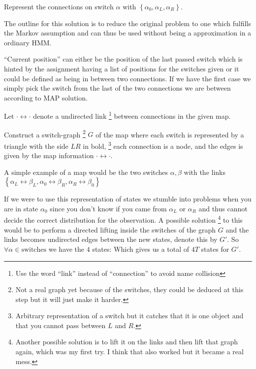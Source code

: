 \documentclass[a4paper,twoside=false,abstract=false,numbers=noenddot,
titlepage=false,headings=small,parskip=half,version=last]{scrartcl}
\begin{document}
\begin{solution}
    Represent the connections on switch $\alpha$ with 
    $\left\{\alpha_0,\alpha_L,\alpha_R\right\}$. 

    The outline for this solution is to reduce the original problem to one
    which fulfills the Markov assumption and can thus be used without being a
    approximation in a ordinary HMM.

    ``Current position'' can either be the position of the last passed switch
    which is hinted by the assignment having a list of positions for the
    switches given or it could be defined as being in between two connections.
    If we have the first case we simply pick the switch from the last of the
    two connections we are between according to MAP solution. 

    Let $\cdot\leftrightarrow\cdot$ denote a undirected link
    \footnote{Use the word ``link'' instead of ``connection'' to avoid 
    name collision}
    between connections in the given map.

    Construct a switch-graph
    \footnote{Not a real graph yet because of the
    switches, they could be deduced at this step but it will just make it
    harder.}
    $G$ of the map where each switch is represented by a triangle with the
    side $LR$ in bold,
    \footnote{Arbitrary representation of a switch but it catches that it is
    one object and that you cannot pass between $L$ and $R$.} 
    each connection is a node, and the edges is given by the map information
    $\cdot\leftrightarrow\cdot$. 

    A simple example of a map would be the two switches $\alpha,\beta$ with the
    links 
    $\left\{
        \alpha_L\leftrightarrow\beta_L,
        \alpha_0\leftrightarrow\beta_R,
        \alpha_R\leftrightarrow\beta_0
    \right\}$

    If we were to use this representation of states we stumble into
    problems when you are in state $\alpha_0$ since you don't know if you came
    from $\alpha_L$ or $\alpha_R$ and thus cannot decide the correct 
    distribution for the observation. A possible solution
    \footnote{Another possible solution is to lift it on the links and then
    lift that graph again, which was my first try. I think that also worked but
    it became a real mess.}
    to this would be to
    perform a directed lifting inside the switches of the graph $G$ and the
    links becomes undirected edges between the new states, denote 
    this by $G'$.
    So $\forall \alpha \in \text{switches}$ we have the $4$ states:
    Which gives us a total of $4T$ states for $G'$.


\end{solution}
\end{document}
